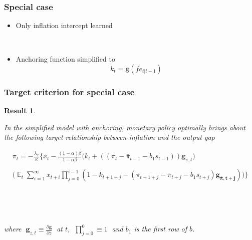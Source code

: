\documentclass{beamer}
\DeclareMathOperator{\E}{\mathbb{E}}
\newtheorem{result}{Result}
\begin{document}
\begin{frame}
	\frametitle{Special case}

\begin{itemize}
\item Only inflation intercept learned

\

\item Anchoring function simplified to 
\begin{equation}
k_t = \mathbf{g}(fe_{t|t-1}) \label{gain_simple}
\end{equation}
\end{itemize}

\end{frame}

\begin{frame}
	\frametitle{Target criterion for special case}
	\label{anchTC}
	
	\begin{result} 

\

In the simplified model with anchoring, monetary policy optimally brings about the following target relationship between inflation and the output gap
	
\begin{align*}
\pi_t  = -\frac{\lambda_x}{\kappa}\bigg\{x_t - \frac{(1-\alpha)\beta}{1-\alpha\beta} \bigg(k_t+((\pi_t - \bar{\pi}_{t-1}-b_1 s_{t-1}))\mathbf{g}_{\pi,t}\bigg) \\
\\
\bigg(\E_t\sum_{i=1}^{\infty}x_{t+i}\prod_{j=0}^{i-1}(1-k_{t+1+j} - (\pi_{t+1+j} - \bar{\pi}_{t+j}-b_1 s_{t+j})\mathbf{g_{\bar{\pi}, t+j}}) \bigg)
\bigg\}  \label{target}
\end{align*}

\

\

where $\; \mathbf{g}_{z,t} \equiv \frac{\partial \mathbf{g}}{\partial z}\;$ at $t$, $\; \prod_{j=0}^{0} \equiv 1 \; $ and $b_1$ is the first row of $b$.
	\end{result}


\end{frame}
\end{document}
